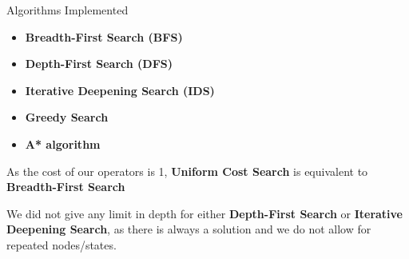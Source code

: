 

\begin{frame}{Algorithms Implemented}
    \begin{itemize}
        \item \textbf{Breadth-First Search (BFS)} 
        \item \textbf{Depth-First Search (DFS)}
        \item \textbf{Iterative Deepening Search (IDS)}
        \item \textbf{Greedy Search}
        \item \textbf{A* algorithm}
    
    \end{itemize}
    
    As the cost of our operators is 1, \textbf{Uniform Cost Search} is equivalent to \textbf{Breadth-First Search}
    
    We did not give any limit in depth for either \textbf{Depth-First Search} or \textbf{Iterative Deepening Search}, as there is always a solution and we do not allow for repeated nodes/states.
    
\end{frame}
